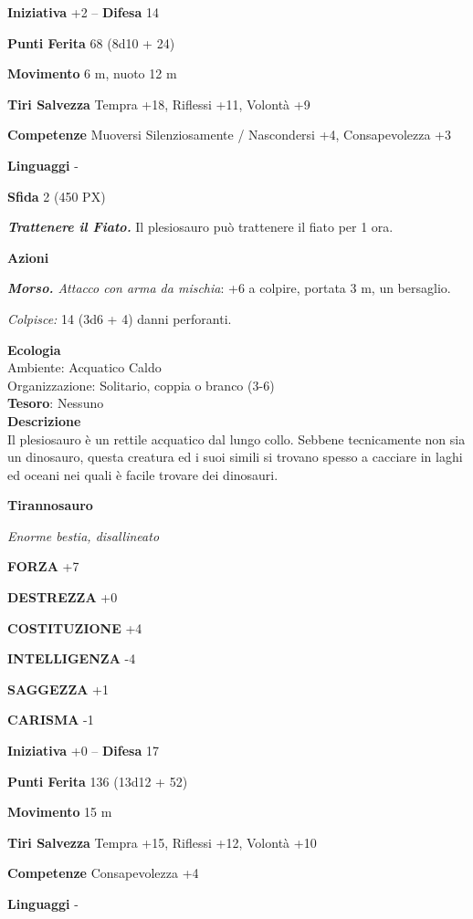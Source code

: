 \begin{multicols}{2}
\textbf{Iniziativa} +2 -- \textbf{Difesa} 14

\textbf{Punti Ferita} 68 (8d10 + 24)

\textbf{Movimento} 6 m, nuoto 12 m

\textbf{Tiri Salvezza} Tempra +18, Riflessi +11, Volontà +9

\textbf{Competenze} Muoversi Silenziosamente / Nascondersi +4, Consapevolezza +3

\textbf{Linguaggi} -

\textbf{Sfida} 2 (450 PX)

\textit{\textbf{Trattenere il Fiato.}} Il plesiosauro può trattenere il fiato per 1 ora.

\textbf{Azioni}

\textit{\textbf{Morso.} Attacco con arma da mischia}: +6 a colpire, portata 3 m, un bersaglio.

\textit{Colpisce:} 14 (3d6 + 4) danni perforanti.

\textbf{Ecologia}\\
Ambiente: Acquatico Caldo\\
Organizzazione: Solitario, coppia o branco (3-6)\\
\textbf{Tesoro}: Nessuno\\
\textbf{Descrizione}\\
Il plesiosauro è un rettile acquatico dal lungo collo. Sebbene tecnicamente non sia un dinosauro, questa creatura ed i suoi simili si trovano spesso a cacciare in laghi ed oceani nei quali è facile trovare dei dinosauri.


\medskip{}\textbf{Tirannosauro}

\textit{Enorme bestia, disallineato}

\textbf{FORZA} +7

\textbf{DESTREZZA} +0

\textbf{COSTITUZIONE} +4

\textbf{INTELLIGENZA} -4

\textbf{SAGGEZZA} +1

\textbf{CARISMA} -1

\textbf{Iniziativa} +0 -- \textbf{Difesa} 17

\textbf{Punti Ferita} 136 (13d12 + 52)

\textbf{Movimento} 15 m

\textbf{Tiri Salvezza} Tempra +15, Riflessi +12, Volontà +10

\textbf{Competenze} Consapevolezza +4

\textbf{Linguaggi} -


\end{multicols}
